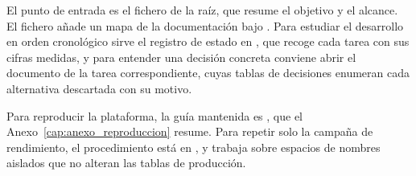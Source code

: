 El punto de entrada es el fichero  de la raíz, que resume el
objetivo y el alcance. El fichero  añade un mapa de la
documentación bajo . Para estudiar el desarrollo en orden
cronológico sirve el registro de estado en
, que recoge cada tarea con sus
cifras medidas, y para entender una decisión concreta conviene abrir el
documento de la tarea correspondiente, cuyas tablas de decisiones enumeran
cada alternativa descartada con su motivo.

Para reproducir la plataforma, la guía mantenida es
, que el
Anexo~\ref{cap:anexo_reproduccion} resume. Para repetir solo la campaña de
rendimiento, el procedimiento está en , y
trabaja sobre espacios de nombres aislados que no alteran las tablas de
producción.

